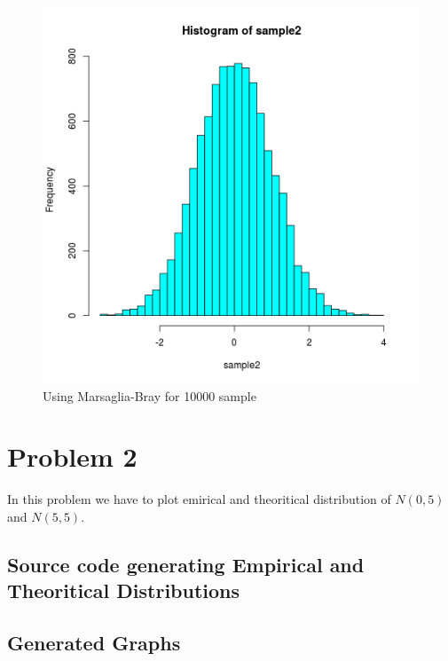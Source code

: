 \documentclass{article}
\begin{document}
			\begin{figure}
  			\includegraphics[width=\linewidth]{pic/que1_tenthousand_2.png}
 			 \caption{Using Marsaglia-Bray for 10000 sample} 
  			\label{fig:hist1}
		\end{figure}	
		
		\clearpage
		
		
		
	\section{Problem 2}
		In this problem we have to plot emirical and theoritical distribution of $N(0,5)$ and $N(5,5)$.
					
	\subsection{Source code generating Empirical and Theoritical Distributions}
		
		
	\subsection{Generated Graphs}
	
\end{document}
